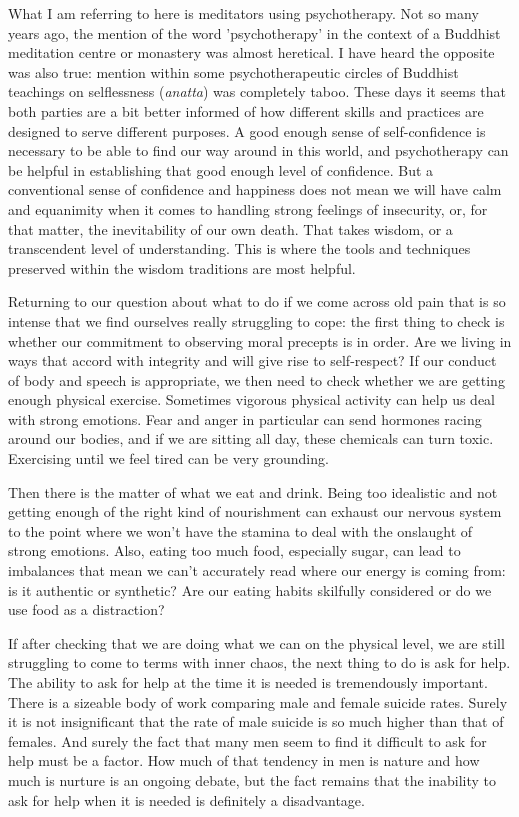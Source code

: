 What I am referring to here is meditators using psychotherapy. Not so
many years ago, the mention of the word 'psychotherapy' in the context
of a Buddhist meditation centre or monastery was almost heretical. I
have heard the opposite was also true: mention within some
psychotherapeutic circles of Buddhist teachings on selflessness
(\emph{anatta}) was completely taboo. These days it seems that both
parties are a bit better informed of how different skills and practices
are designed to serve different purposes. A good enough sense of
self-confidence is necessary to be able to find our way around in this
world, and psychotherapy can be helpful in establishing that good enough
level of confidence. But a conventional sense of confidence and
happiness does not mean we will have calm and equanimity when it comes
to handling strong feelings of insecurity, or, for that matter, the
inevitability of our own death. That takes wisdom, or a transcendent
level of understanding. This is where the tools and techniques preserved
within the wisdom traditions are most helpful.

Returning to our question about what to do if we come across old pain
that is so intense that we find ourselves really struggling to cope: the
first thing to check is whether our commitment to observing moral
precepts is in order. Are we living in ways that accord with integrity
and will give rise to self-respect? If our conduct of body and speech is
appropriate, we then need to check whether we are getting enough
physical exercise. Sometimes vigorous physical activity can help us deal
with strong emotions. Fear and anger in particular can send hormones
racing around our bodies, and if we are sitting all day, these chemicals
can turn toxic. Exercising until we feel tired can be very grounding.

Then there is the matter of what we eat and drink. Being too idealistic
and not getting enough of the right kind of nourishment can exhaust our
nervous system to the point where we won't have the stamina to deal with
the onslaught of strong emotions. Also, eating too much food, especially
sugar, can lead to imbalances that mean we can't accurately read where
our energy is coming from: is it authentic or synthetic? Are our eating
habits skilfully considered or do we use food as a distraction?

If after checking that we are doing what we can on the physical level,
we are still struggling to come to terms with inner chaos, the next
thing to do is ask for help. The ability to ask for help at the time it
is needed is tremendously important. There is a sizeable body of work
comparing male and female suicide rates. Surely it is not insignificant
that the rate of male suicide is so much higher than that of females.\cite{suicide-rates}
And surely the fact that many men seem to find it difficult to
ask for help must be a factor. How much of that tendency in men is
nature and how much is nurture is an ongoing debate, but the fact
remains that the inability to ask for help when it is needed is
definitely a disadvantage.

